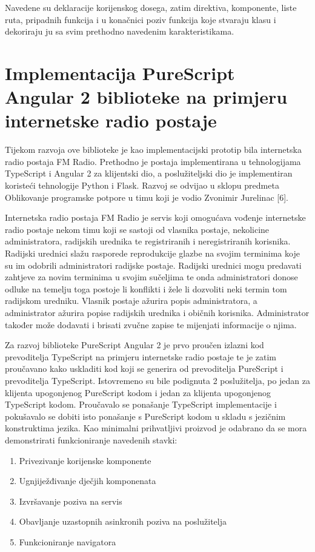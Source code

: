 \documentclass[times, utf8, zavrsni]{fer}
\begin{document}
Navedene su deklaracije korijenskog dosega, zatim direktiva, komponente, liste ruta, pripadnih funkcija i u konačnici poziv funkcija koje stvaraju klasu i dekoriraju ju sa svim prethodno navedenim karakteristikama.

\section{Implementacija PureScript Angular 2 biblioteke na primjeru internetske radio postaje}
Tijekom razvoja ove biblioteke je kao implementacijski prototip bila internetska radio postaja FM Radio. Prethodno je postaja implementirana u tehnologijama TypeScript i Angular 2 za klijentski dio, a poslužiteljski dio je implementiran koristeći tehnologije Python i Flask. Razvoj se odvijao u sklopu predmeta Oblikovanje programske potpore u timu koji je vodio Zvonimir Jurelinac [6]. 

Internetska radio postaja FM Radio je servis koji omogućava vođenje internetske radio postaje nekom timu koji se sastoji od vlasnika postaje, nekolicine administratora, radijskih urednika te registriranih i neregistriranih korisnika. Radijski urednici slažu rasporede reprodukcije glazbe na svojim terminima koje su im odobrili administratori radijske postaje. Radijski urednici mogu predavati zahtjeve za novim terminima u svojim sučeljima te onda administratori donose odluke na temelju toga postoje li konflikti i žele li dozvoliti neki termin tom radijskom uredniku. Vlasnik postaje ažurira popis administratora, a administrator ažurira popise radijskih urednika i običnih korisnika. Administrator također može dodavati i brisati zvučne zapise te mijenjati informacije o njima.

Za razvoj biblioteke PureScript Angular 2 je prvo proučen izlazni kod prevoditelja TypeScript na primjeru internetske radio postaje te je zatim proučavano kako uskladiti kod koji se generira od prevoditelja PureScript i prevoditelja TypeScript. Istovremeno su bile podignuta 2 poslužitelja, po jedan za klijenta upogonjenog PureScript kodom i jedan za klijenta upogonjenog TypeScript kodom. Proučavalo se ponašanje TypeScript implementacije i pokušavalo se dobiti isto ponašanje s PureScript kodom u skladu s jezičnim konstruktima jezika. Kao minimalni prihvatljivi proizvod je odabrano da se mora demonstrirati funkcioniranje navedenih stavki:

\begin{enumerate}
\item Privezivanje korijenske komponente
\item Ugnjiježđivanje dječjih komponenata
\item Izvršavanje poziva na servis
\item Obavljanje uzastopnih asinkronih poziva na poslužitelja
\item Funkcioniranje navigatora
\end{enumerate}
\end{document}
